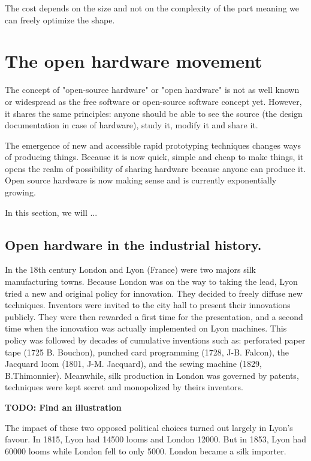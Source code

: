 The cost depends on the size and not on the complexity of the part meaning we can freely optimize the shape.


\newpage
\section{The open hardware movement} %

The concept of "open-source hardware" or "open hardware" is not as well known or widespread as the free software or open-source software concept yet. However, it shares the same principles: anyone should be able to see the source (the design documentation in case of hardware), study it, modify it and share it.

The emergence of new and accessible rapid prototyping techniques changes ways of producing things. Because it is now quick, simple and cheap to make things, it opens the realm of possibility of sharing hardware because anyone can produce it. Open source hardware is now making sense and is currently exponentially growing.

In this section, we will ...

\subsection{Open hardware in the industrial history.} %

In the 18th century London and Lyon (France) were two majors silk manufacturing towns. Because London was on the way to taking the lead, Lyon tried a new and original policy for innovation. They decided to freely diffuse new techniques. Inventors were invited to the city hall to present their innovations publicly. They were then rewarded a first time for the presentation, and a second time when the innovation was actually implemented on Lyon machines. This policy was followed by decades of cumulative inventions such as: perforated paper tape (1725 B. Bouchon), punched card programming (1728, J-B. Falcon), the Jacquard loom (1801, J-M. Jacquard), and the sewing machine (1829, B.Thimonnier). Meanwhile, silk production in London was governed by patents, techniques were kept secret and monopolized by theirs inventors. \cite{alain1997fate}

\textbf{TODO: Find an illustration}

The impact of these two opposed political choices turned out largely in Lyon’s favour. In 1815, Lyon had 14500 looms and London 12000. But in 1853, Lyon had 60000 looms while London fell to only 5000. London became a silk importer.

